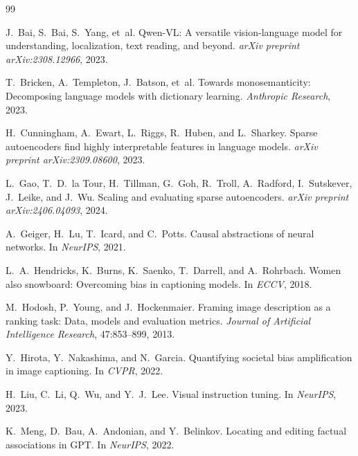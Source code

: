 \documentclass[11pt,a4paper]{article}
\begin{document}
\begin{thebibliography}{99}

J.~Bai, S.~Bai, S.~Yang, et~al.
\newblock Qwen-VL: A versatile vision-language model for understanding, localization, text reading, and beyond.
\newblock \emph{arXiv preprint arXiv:2308.12966}, 2023.

T.~Bricken, A.~Templeton, J.~Batson, et~al.
\newblock Towards monosemanticity: Decomposing language models with dictionary learning.
\newblock \emph{Anthropic Research}, 2023.

H.~Cunningham, A.~Ewart, L.~Riggs, R.~Huben, and L.~Sharkey.
\newblock Sparse autoencoders find highly interpretable features in language models.
\newblock \emph{arXiv preprint arXiv:2309.08600}, 2023.

L.~Gao, T.~D.~la Tour, H.~Tillman, G.~Goh, R.~Troll, A.~Radford, I.~Sutskever, J.~Leike, and J.~Wu.
\newblock Scaling and evaluating sparse autoencoders.
\newblock \emph{arXiv preprint arXiv:2406.04093}, 2024.

A.~Geiger, H.~Lu, T.~Icard, and C.~Potts.
\newblock Causal abstractions of neural networks.
\newblock In \emph{NeurIPS}, 2021.

L.~A.~Hendricks, K.~Burns, K.~Saenko, T.~Darrell, and A.~Rohrbach.
\newblock Women also snowboard: Overcoming bias in captioning models.
\newblock In \emph{ECCV}, 2018.

M.~Hodosh, P.~Young, and J.~Hockenmaier.
\newblock Framing image description as a ranking task: Data, models and evaluation metrics.
\newblock \emph{Journal of Artificial Intelligence Research}, 47:853--899, 2013.

Y.~Hirota, Y.~Nakashima, and N.~Garcia.
\newblock Quantifying societal bias amplification in image captioning.
\newblock In \emph{CVPR}, 2022.

H.~Liu, C.~Li, Q.~Wu, and Y.~J.~Lee.
\newblock Visual instruction tuning.
\newblock In \emph{NeurIPS}, 2023.

K.~Meng, D.~Bau, A.~Andonian, and Y.~Belinkov.
\newblock Locating and editing factual associations in {GPT}.
\newblock In \emph{NeurIPS}, 2022.


\end{thebibliography}
\end{document}
